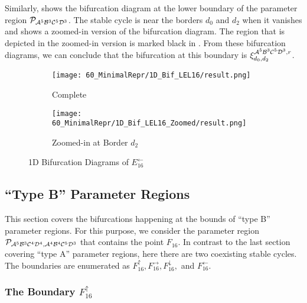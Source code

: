 Similarly,  shows the bifurcation diagram at the lower boundary of the parameter region $\mathcal{P}_{\mathcal{A}^5\mathcal{B}^3\mathcal{C}^5\mathcal{D}^3}$.
The stable cycle is near the borders $d_0$ and $d_2$ when it vanishes and  shows a zoomed-in version of the bifurcation diagram.
The region that is depicted in the zoomed-in version is marked black in .
From these bifurcation diagrams, we can conclude that the bifurcation at this boundary is $\xi_{d_0, d_2}^{\mathcal{A}^5\mathcal{B}^3\mathcal{C}^5\mathcal{D}^3, r}$.

\begin{figure}
    \centering
    \begin{subfigure}{0.4\textwidth}
        \centering
        \texttt{[image: 60\_MinimalRepr/1D\_Bif\_LEL16/result.png]}
        \caption{Complete}
        \label{fig:final.bifurcation.E.left}
    \end{subfigure}
    \begin{subfigure}{0.4\textwidth}
        \centering
        \texttt{[image: 60\_MinimalRepr/1D\_Bif\_LEL16\_Zoomed/result.png]}
        \caption{Zoomed-in at Border $d_2$}
        \label{fig:final.bifurcation.E.left.zoomed}
    \end{subfigure}
    \caption{1D Bifurcation Diagrams of $E_{16}^\leftarrow$}
\end{figure}

\subsection{``Type B'' Parameter Regions}

This section covers the bifurcations happening at the bounds of ``type B'' parameter regions.
For this purpose, we consider the parameter region $\mathcal{P}_{\mathcal{A}^5\mathcal{B}^3\mathcal{C}^4\mathcal{D}^4, \mathcal{A}^4\mathcal{B}^4\mathcal{C}^5\mathcal{D}^3}$ that contains the point $F_{16}$.
In contrast to the last section covering ``type A'' parameter regions, here there are two coexisting stable cycles.
The boundaries are enumerated as $F_{16}^\uparrow, F_{16}^\rightarrow, F_{16}^\downarrow,$ and $F_{16}^\leftarrow$.

\subsubsection{The Boundary $F_{16}^\uparrow$}

